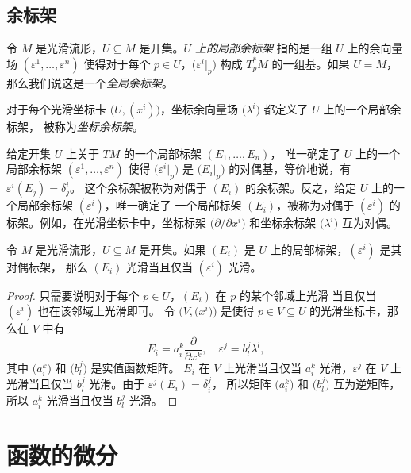 \documentclass[fontset=none]{Notes}
\begin{document}
\subsection{余标架}

令 $M$ 是光滑流形，$U\subseteq M$ 是开集。\emph{$U$ 上的局部余标架}
指的是一组 $U$ 上的余向量场 $(\varepsilon^1,\dots,\varepsilon^n)$
使得对于每个 $p\in U$，$\bigl(\varepsilon^i|_p\bigr)$ 构成
$T_p^*M$ 的一组基。如果 $U=M$，那么我们说这是一个\emph{全局余标架}。

\begin{example}[坐标余标架]
  对于每个光滑坐标卡 $\bigl(U,(x^i)\bigr)$，坐标余向量场
  $\bigl(\lambda^i\bigr)$ 都定义了 $U$ 上的一个局部余标架，
  被称为\emph{坐标余标架}。
\end{example}

给定开集 $U$ 上关于 $TM$ 的一个局部标架 $(E_1,\dots,E_n)$，
唯一确定了 $U$ 上的一个局部余标架 $(\varepsilon^1,\dots,\varepsilon^n)$
使得 $\bigl(\varepsilon^i|_p\bigr)$ 是 $\bigl(E_i|_p\bigr)$
的对偶基，等价地说，有 $\varepsilon^i(E_j)=\delta_j^i$。
这个余标架被称为对偶于 $(E_i)$ 的余标架。反之，给定
$U$ 上的一个局部余标架 $(\varepsilon^i)$，唯一确定了
一个局部标架 $(E_i)$，被称为对偶于 $(\varepsilon^i)$
的标架。例如，在光滑坐标卡中，坐标标架 $\bigl(\partial/\partial x^i\bigr)$
和坐标余标架 $\bigl(\lambda^i\bigr)$ 互为对偶。

\begin{lemma}
  令 $M$ 是光滑流形，$U\subseteq M$ 是开集。如果 $(E_i)$
  是 $U$ 上的局部标架，$(\varepsilon^i)$ 是其对偶标架，
  那么 $(E_i)$ 光滑当且仅当 $(\varepsilon^i)$ 光滑。
\end{lemma}
\begin{proof}
  只需要说明对于每个 $p\in U$，$(E_i)$ 在 $p$ 的某个邻域上光滑
  当且仅当 $(\varepsilon^i)$ 也在该邻域上光滑即可。
  令 $\bigl(V,\bigl(x^i\bigr)\bigr)$ 是使得 $p\in V\subseteq U$
  的光滑坐标卡，那么在 $V$ 中有
  \[
    E_i=a_i^k\frac{\partial}{\partial x^k},\quad
    \varepsilon^j=b_l^j\lambda^l,
  \]
  其中 $\bigl(a_i^k\bigr)$ 和 $\bigl(b_l^j\bigr)$ 是实值函数矩阵。
  $E_i$ 在 $V$ 上光滑当且仅当 $a_i^k$ 光滑，$\varepsilon^j$ 
  在 $V$ 上光滑当且仅当 $b_l^j$ 光滑。由于 $\varepsilon^j(E_i)=\delta_i^j$，
  所以矩阵 $\bigl(a_i^k\bigr)$ 和 $\bigl(b_l^j\bigr)$ 互为逆矩阵，
  所以 $a_i^k$ 光滑当且仅当 $b_l^j$ 光滑。
\end{proof}





\section{函数的微分}
\end{document}
